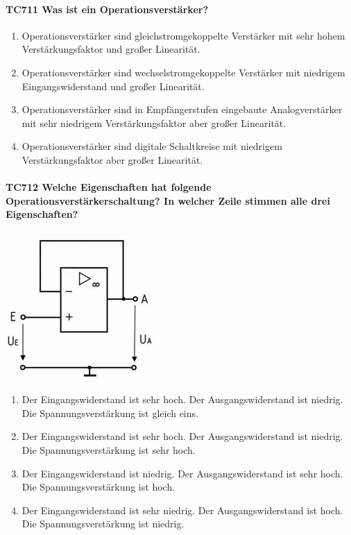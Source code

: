 \documentclass[8pt]{article}
\begin{document}
\begin{enumerate}
\begin{enumerate}[nolistsep,label=\Alph*]
{\begin{enumerate}[nolistsep,label=\Alph*]
\paragraph*{TC711 Was ist ein Operationsverstärker?}
\begin{enumerate}[nolistsep,label=\Alph*]
\item Operationsverstärker sind gleichstromgekoppelte Verstärker mit sehr hohem Verstärkungsfaktor und großer Linearität.
\item Operationsverstärker sind wechselstromgekoppelte Verstärker mit niedrigem Eingangswiderstand und großer Linearität.
\item Operationsverstärker sind in Empfängerstufen eingebaute Analogverstärker mit sehr niedrigem Verstärkungsfaktor aber großer Linearität.
\item Operationsverstärker sind digitale Schaltkreise mit niedrigem Verstärkungsfaktor aber großer Linearität.
\end{enumerate}

\paragraph*{TC712 Welche Eigenschaften hat folgende Operationsverstärkerschaltung? In welcher Zeile stimmen alle drei Eigenschaften?}
\begin{center}
	\begin{minipage}{\linewidth}
		\centering
		\includegraphics[scale=1.0]{pics/tc712_a.jpg}
	\end{minipage}
\end{center}
\begin{enumerate}[nolistsep,label=\Alph*]
\item Der Eingangswiderstand ist sehr hoch. Der Ausgangswiderstand ist niedrig. Die Spannungsverstärkung ist gleich eins.
\item Der Eingangswiderstand ist sehr hoch. Der Ausgangswiderstand ist niedrig. Die Spannungsverstärkung ist sehr hoch.
\item Der Eingangswiderstand ist niedrig. Der Ausgangswiderstand ist sehr hoch. Die Spannungsverstärkung ist hoch.
\item Der Eingangswiderstand ist sehr niedrig. Der Ausgangswiderstand ist hoch. Die Spannungsverstärkung ist niedrig.
\end{enumerate}


\end{enumerate}}
\end{enumerate}
\end{enumerate}
\end{document}
